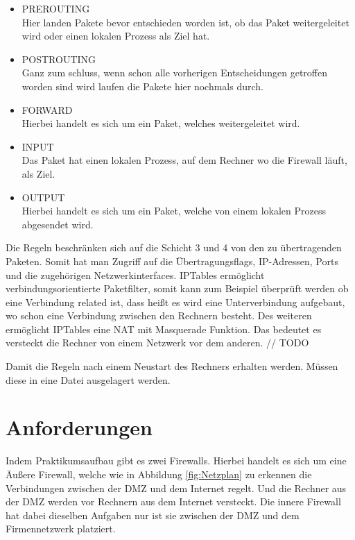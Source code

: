 \begin{itemize}
	\item PREROUTING \\
	Hier landen Pakete bevor entschieden worden ist, ob das Paket weitergeleitet wird oder einen lokalen Prozess als Ziel hat.
	\item POSTROUTING \\
	Ganz zum schluss, wenn schon alle vorherigen Entscheidungen getroffen worden sind wird laufen die Pakete hier nochmals durch.
	\item FORWARD \\
	Hierbei handelt es sich um ein Paket, welches weitergeleitet wird.
	\item INPUT \\
	Das Paket hat einen lokalen Prozess, auf dem Rechner wo die Firewall läuft, als Ziel.
	\item OUTPUT \\
	Hierbei handelt es sich um ein Paket, welche von einem lokalen Prozess abgesendet wird.
\end{itemize}
Die Regeln beschränken sich auf die Schicht 3 und 4 von den zu übertragenden Paketen. Somit hat man Zugriff auf die Übertragungsflags, IP-Adressen, Ports und die zugehörigen Netzwerkinterfaces. IPTables ermöglicht verbindungsorientierte Paketfilter, somit kann zum Beispiel überprüft werden ob eine Verbindung related ist, dass heißt es wird eine Unterverbindung aufgebaut, wo schon eine Verbindung zwischen den Rechnern besteht. Des weiteren ermöglicht IPTables eine NAT mit Masquerade Funktion. Das bedeutet es versteckt die Rechner von einem Netzwerk vor dem anderen.
// TODO

Damit die Regeln nach einem Neustart des Rechners erhalten werden. Müssen diese in eine Datei ausgelagert werden.


\section{Anforderungen}
Indem Praktikumsaufbau gibt es zwei Firewalls. Hierbei handelt es sich um eine Äußere Firewall, welche wie in Abbildung \ref{fig:Netzplan} zu erkennen die Verbindungen zwischen der DMZ und dem Internet regelt. Und die Rechner aus der DMZ werden vor Rechnern aus dem Internet versteckt. Die innere Firewall hat dabei dieselben Aufgaben nur ist sie zwischen der DMZ und dem Firmennetzwerk platziert.

